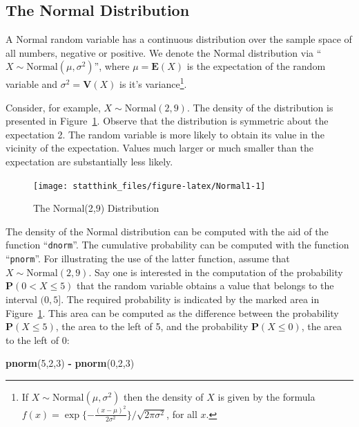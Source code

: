 \documentclass[]{krantz}
\makeatletter
\newenvironment{Shaded}{\begin{snugshade}}{\end{snugshade}}
\newcommand{\DecValTok}[1]{\textcolor[rgb]{0.00,0.00,0.81}{#1}}
\newcommand{\KeywordTok}[1]{\textcolor[rgb]{0.13,0.29,0.53}{\textbf{#1}}}
\newcommand{\NormalTok}[1]{#1}
\newcommand{\OperatorTok}[1]{\textcolor[rgb]{0.81,0.36,0.00}{\textbf{#1}}}
\newcommand{\StringTok}[1]{\textcolor[rgb]{0.31,0.60,0.02}{#1}}
\newcommand{\Expec}{\mathbf{E}}
\newcommand{\Prob}{\mathbf{P}}
\newcommand{\Var}{\mathbf{V}}
\newenvironment{kframe}{%
\medskip{}
\setlength{\fboxsep}{.8em}
 \def\at@end@of@kframe{}%
 \ifinner\ifhmode%
  \def\at@end@of@kframe{\end{minipage}}%
  \begin{minipage}{\columnwidth}%
 \fi\fi%
 \def\FrameCommand##1{\hskip\@totalleftmargin \hskip-\fboxsep
 \colorbox{shadecolor}{##1}\hskip-\fboxsep
     \hskip-\linewidth \hskip-\@totalleftmargin \hskip\columnwidth}%
 \MakeFramed {\advance\hsize-\width
   \@totalleftmargin\z@ \linewidth\hsize
   \@setminipage}}%
 {\par\unskip\endMakeFramed%
 \at@end@of@kframe}
\renewenvironment{Shaded}{\begin{kframe}}{\end{kframe}}
\theoremstyle{definition}
\theoremstyle{definition}
\theoremstyle{definition}
\theoremstyle{remark}
\makeatother
\begin{document}
\hypertarget{the-normal-distribution}{%
\subsection{The Normal Distribution}\label{the-normal-distribution}}

A Normal random variable has a continuous distribution over the sample
space of all numbers, negative or positive. We denote the Normal
distribution via ``\(X \sim \mathrm{Normal}(\mu, \sigma^2)\)'', where
\(\mu = \Expec(X)\) is the expectation of the random variable and
\(\sigma^2 = \Var(X)\) is it's variance\footnote{If \(X \sim \mbox{Normal}(\mu,\sigma^2)\) then the density of \(X\) is
  given by the formula
  \(f(x) = \exp\{-\frac{(x-\mu)^2}{2 \sigma^2}\}/\sqrt{2 \pi \sigma^2}\),
  for all \(x\).}.

Consider, for example, \(X \sim \mathrm{Normal}(2,9)\). The density of the
distribution is presented in Figure~\ref{fig:Normal1}. Observe that the
distribution is symmetric about the expectation 2. The random variable
is more likely to obtain its value in the vicinity of the expectation.
Values much larger or much smaller than the expectation are
substantially less likely.

\begin{figure}

{\centering \texttt{[image: statthink\_files/figure-latex/Normal1-1]} 

}

\caption{The Normal(2,9) Distribution}\label{fig:Normal1}
\end{figure}

The density of the Normal distribution can be computed with the aid of
the function ``\texttt{dnorm}''. The cumulative probability can be computed with
the function ``\texttt{pnorm}''. For illustrating the use of the latter function,
assume that \(X \sim \mathrm{Normal}(2,9)\). Say one is interested in the
computation of the probability \(\Prob(0 < X \leq 5)\) that the random
variable obtains a value that belongs to the interval \((0,5]\). The
required probability is indicated by the marked area in
Figure~\ref{fig:Normal1}. This area can be computed as the difference
between the probability \(\Prob(X \leq 5)\), the area to the left of 5,
and the probability \(\Prob(X \leq 0)\), the area to the left of 0:

\begin{Shaded}
\begin{Highlighting}[]
\KeywordTok{pnorm}\NormalTok{(}\DecValTok{5}\NormalTok{,}\DecValTok{2}\NormalTok{,}\DecValTok{3}\NormalTok{) }\OperatorTok{-}\StringTok{ }\KeywordTok{pnorm}\NormalTok{(}\DecValTok{0}\NormalTok{,}\DecValTok{2}\NormalTok{,}\DecValTok{3}\NormalTok{)}
\end{Highlighting}
\end{Shaded}
\end{document}
